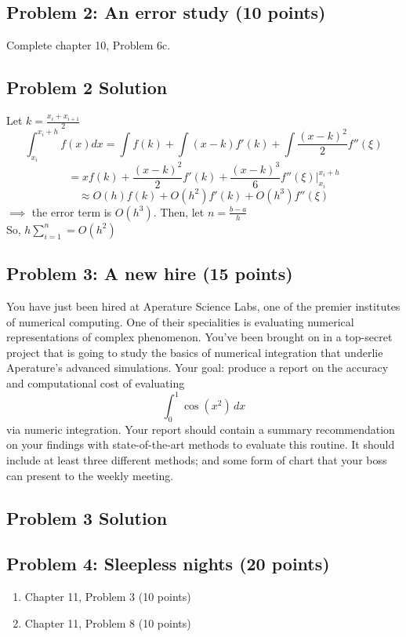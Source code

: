 \documentclass[]{article}
\providecommand{\tightlist}{%
  \setlength{\itemsep}{0pt}\setlength{\parskip}{0pt}}
\begin{document}
\subsection{Problem 2: An error study (10
points)}\label{problem-2-an-error-study-10-points}

Complete chapter 10, Problem 6c.

\subsection{Problem 2 Solution}
Let $k=\frac{x_i + x_{i+1}}{2}$
\[ \int_{x_i}^{x_i+h} f(x)dx = \int f(k) + \int (x-k)f'(k) + \int \frac{(x-k)^2}{2} f''(\xi) \]
\[ = xf(k) + \frac{(x-k)^2}{2}f'(k) + \frac{(x-k)^3}{6}f''(\xi) \bigg|_{x_i}^{x_i+h}\]
\[ \approx O(h)f(k) + O(h^2)f'(k) + O(h^3)f''(\xi)\]
$\implies$ the error term is $O(h^3)$. Then, let $n=\frac{b-a}{h}$ \\
So, $h \sum_{i=1}^{n} = O(h^2)$

\subsection{Problem 3: A new hire (15
points)}\label{problem-3-a-new-hire-15-points}

You have just been hired at Aperature Science Labs, one of the premier
institutes of numerical computing. One of their specialities is
evaluating numerical representations of complex phenomenon. You've been
brought on in a top-secret project that is going to study the basics of
numerical integration that underlie Aperature's advanced simulations.
Your goal: produce a report on the accuracy and computational cost of
evaluating \[ \int_0^1 \cos(x^2) \, dx \] via numeric integration. Your
report should contain a summary recommendation on your findings with
state-of-the-art methods to evaluate this routine. It should include at
least three different methods; and some form of chart that your boss can
present to the weekly meeting.

\subsection{Problem 3 Solution}

\subsection{Problem 4: Sleepless nights (20
points)}\label{problem-4-sleepless-nights-20-points}

\begin{enumerate}
\def\labelenumi{\arabic{enumi}.}
\tightlist
\item
  Chapter 11, Problem 3 (10 points)
\item
  Chapter 11, Problem 8 (10 points)
\end{enumerate}
\end{document}
